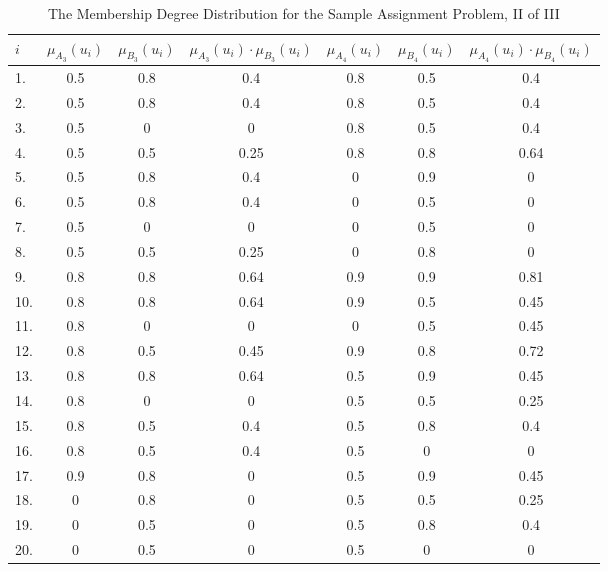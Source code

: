 \documentclass[a4paper,openany]{book}
\begin{document}
				\begin{table}[!th]
					\begin{center}
						\begin{tabular}{|l|c|c|c|c|c|c|}
							\hline
							\textbf{$i$} & \textbf{$\mu_{A_3}(u_i)$} & \textbf{$\mu_{B_3}(u_i)$} & \textbf{$\mu_{A_3}(u_i)\cdot\mu_{B_3}(u_i)$} & \textbf{$\mu_{A_4}(u_i)$} & \textbf{$\mu_{B_4}(u_i)$} & \textbf{$\mu_{A_4}(u_i)\cdot\mu_{B_4}(u_i)$}\\
							\hline
							1. & 0.5 & 0.8 & 0.4 & 0.8 & 0.5 & 0.4 \\
							\hline
							2. & 0.5 & 0.8 & 0.4 & 0.8 & 0.5 & 0.4 \\
							\hline
							3. & 0.5 & 0 & 0 & 0.8 & 0.5 & 0.4 \\
							\hline
							4. & 0.5 & 0.5 & 0.25 & 0.8 & 0.8 & 0.64 \\
							\hline
							5. & 0.5 & 0.8 & 0.4 & 0 & 0.9 & 0 \\
							\hline
							6. & 0.5 & 0.8 & 0.4 & 0 & 0.5 & 0 \\
							\hline
							7. & 0.5 & 0 & 0 & 0 & 0.5 & 0 \\
							\hline
							8. & 0.5 & 0.5 & 0.25 & 0 & 0.8 & 0 \\
							\hline
							9. & 0.8 & 0.8 & 0.64 & 0.9 & 0.9 & 0.81 \\
							\hline
							10. & 0.8 & 0.8 & 0.64 & 0.9 & 0.5 & 0.45 \\
							\hline
							11. & 0.8 & 0 & 0 & 0 & 0.5 & 0.45 \\
							\hline
							12. & 0.8 & 0.5 & 0.45 & 0.9 & 0.8 & 0.72 \\
							\hline
							13. & 0.8 & 0.8 & 0.64 & 0.5 & 0.9 & 0.45 \\
							\hline
							14. & 0.8 & 0 & 0 & 0.5 & 0.5 & 0.25 \\
							\hline
							15. & 0.8 & 0.5 & 0.4 & 0.5 & 0.8 & 0.4 \\
							\hline
							16. & 0.8 & 0.5 & 0.4 & 0.5 & 0 & 0 \\
							\hline
							17. & 0.9 & 0.8 & 0 & 0.5 & 0.9 & 0.45 \\
							\hline
							18. & 0 & 0.8 & 0 & 0.5 & 0.5 & 0.25 \\
							\hline
							19. & 0 & 0.5 & 0 & 0.5 & 0.8 & 0.4 \\
							\hline
							20. & 0 & 0.5 & 0 & 0.5 & 0 & 0 \\
							\hline
						\end{tabular}
						\caption{The Membership Degree Distribution for the Sample Assignment Problem, II of III}
						\label{ex:table3}
					\end{center}					
				\end{table}
\end{document}
